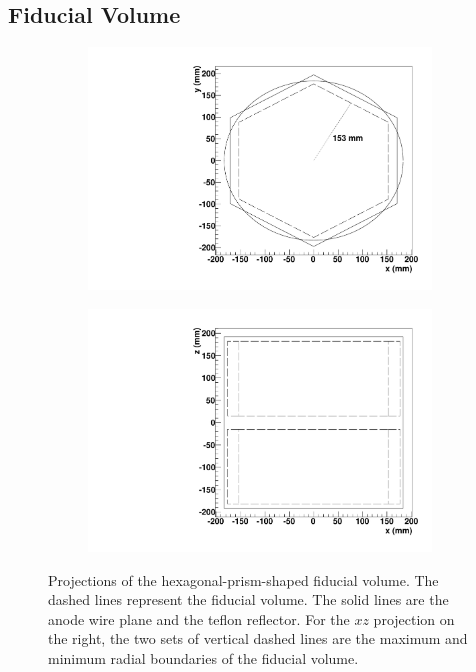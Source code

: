 \documentclass[herrin-thesis.tex]{subfiles}
\begin{document}
\subsection{Fiducial Volume}
\label{sec:analysis_fiducial_volume}
\begin{figure}[htbp]
\centering
	\begin{subfigure}[b]{0.48\textwidth}
	\centering
	\includegraphics[width=\textwidth]{./plots/analysis_fiducial_vol_xy.pdf}
\end{subfigure}\hfill%
\begin{subfigure}[b]{0.48\textwidth}
	\centering
	\includegraphics[width=1\textwidth]{./plots/analysis_fiducial_vol_xz.pdf}
	\end{subfigure}
\caption[Fiducial volume]{Projections of the hexagonal-prism-shaped fiducial volume. The dashed lines represent the fiducial volume. The solid lines are the anode wire plane and the teflon reflector. For the \(xz\) projection on the right, the two sets of vertical dashed lines are the maximum and minimum radial boundaries of the fiducial volume.}
\label{fig:analysis_fiducial_volume}
\end{figure}
\end{document}
